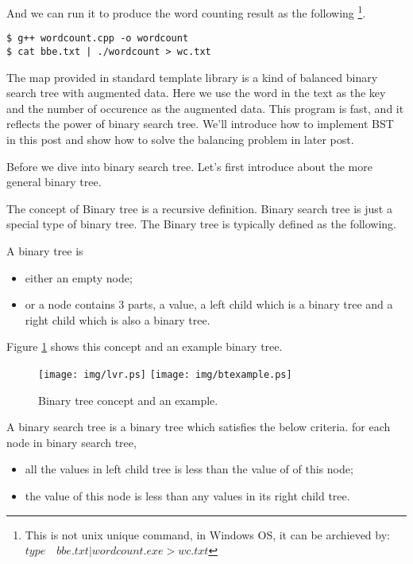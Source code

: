 \documentclass{article}
\begin{document}
And we can run it to produce the word counting result as the following
\footnote{This is not unix unique command, in Windows OS, it can be archieved
by: $type \quad bbe.txt | wordcount.exe > wc.txt$}.

\begin{verbatim}
$ g++ wordcount.cpp -o wordcount
$ cat bbe.txt | ./wordcount > wc.txt
\end{verbatim}

The map provided in standard template library is a kind of balanced binary search tree
with augmented data. Here we use the word in the text as the key and the number of 
occurence as the augmented data. This program is fast, and it reflects the power of
binary search tree. We'll introduce how to implement BST in this post and show how
to solve the balancing problem in later post.

Before we dive into binary search tree. Let's first introduce about
the more general binary tree.

The concept of Binary tree is a recursive definition. Binary search tree is just a special 
type of binary tree. The Binary tree is typically defined as the following.

A binary tree is 
\begin{itemize}
\item either an empty node;
\item or a node contains 3 parts, a value, a left child which is a binary tree and a 
right child which is also a binary tree.
\end{itemize}

Figure \ref{fig:binary-tree-example} shows this concept and an example binary tree.

\begin{figure}[htbp]
       \begin{center}
	\texttt{[image: img/lvr.ps]}
        \texttt{[image: img/btexample.ps]}
        \caption{Binary tree concept and an example.} \label{fig:binary-tree-example}
       \end{center}
\end{figure}

A binary search tree is a binary tree which satisfies the below criteria.
for each node in binary search tree,
\begin{itemize}
\item all the values in left child tree is less than the value of of this node;
\item the value of this node is less than any values in its right child tree.
\end{itemize}
\end{document}
